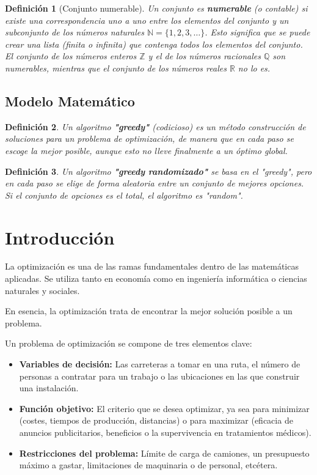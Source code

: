 \documentclass[12pt,a4paper]{book}
\newtheorem{defi}{Definición}[section]
\begin{document}
\begin{defi}[Conjunto numerable]
Un conjunto es \textbf{numerable} (o contable) si existe una correspondencia uno a uno entre los elementos del conjunto y un subconjunto de los números naturales $\mathbb{N} = \{1, 2, 3, \dots\}$. Esto significa que se puede crear una lista (finita o infinita) que contenga todos los elementos del conjunto. El conjunto de los números enteros $\mathbb{Z}$ y el de los números racionales $\mathbb{Q}$ son numerables, mientras que el conjunto de los números reales $\mathbb{R}$ no lo es.
\end{defi}
\section{Modelo Matemático}

\begin{defi}
Un algoritmo \textbf{"greedy"} (codicioso) es un método construcción de soluciones para un problema de optimización,
de manera que en cada paso se escoge la mejor posible, aunque esto no lleve finalmente a un óptimo global.
\end{defi}

\bigskip

\begin{defi}
Un algoritmo \textbf{"greedy randomizado"} se basa en el "greedy", pero en cada paso se elige de forma aleatoria entre un conjunto de mejores opciones.
Si el conjunto de opciones es el total, el algoritmo es "random".
\end{defi}

\chapter{Introducción}
La optimización es una de las ramas fundamentales dentro de las matemáticas aplicadas. Se utiliza tanto en economía como en ingeniería informática o ciencias naturales y sociales.

En esencia, la optimización trata de encontrar la mejor solución posible a un problema.

Un problema de optimización se compone de tres elementos clave:
\begin{itemize}
    \item \textbf{Variables de decisión:} Las carreteras a tomar en una ruta, el número de personas a contratar para un trabajo o las ubicaciones en las que construir una instalación.
    \item \textbf{Función objetivo:} El criterio que se desea optimizar, ya sea para minimizar (costes, tiempos de producción, distancias) o para maximizar (eficacia de anuncios publicitarios, beneficios o la supervivencia en tratamientos médicos).
    \item \textbf{Restricciones del problema:} Límite de carga de camiones, un presupuesto máximo a gastar, limitaciones de maquinaria o de personal, etcétera.
\end{itemize}
\end{document}

